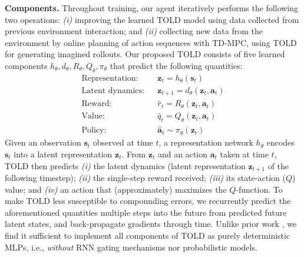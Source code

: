 \documentclass{article}
\begin{document}
\textbf{Components.} Throughout training, our agent iteratively performs the following two operations: \textit{(i)} improving the learned TOLD model using data collected from previous environment interaction; and \textit{(ii)} collecting new data from the environment by online planning of action sequences with TD-MPC, using TOLD for generating imagined rollouts. Our proposed TOLD consists of five learned components $h_{\theta},d_{\theta},R_{\theta},Q_{\theta},\pi_{\theta}$ that predict the following quantities:
\begin{equation}
\begin{array}{lll}
    \text{Representation:} && \mathbf{z}_{t} = h_{\theta}(\mathbf{s}_{t})\\
    \text{Latent dynamics:} && \mathbf{z}_{t+1} = d_{\theta}(\mathbf{z}_{t}, \mathbf{a}_{t})\\
    \text{Reward:} && \hat{r}_{t} = R_{\theta}(\mathbf{z}_{t}, \mathbf{a}_{t})\\
    \text{Value:} && \hat{q}_{t} = Q_{\theta}(\mathbf{z}_{t}, \mathbf{a}_{t})\\
    \text{Policy:} && \hat{\mathbf{a}}_{t} \sim \pi_{\theta}(\mathbf{z}_{t})
\end{array}
\end{equation}
Given an observation $\mathbf{s}_{t}$ observed at time $t$, a representation network $h_{\theta}$ encodes $\mathbf{s}_{t}$ into a latent representation $\mathbf{z}_{t}$. From $\mathbf{z}_{t}$ and an action $\mathbf{a}_{t}$ taken at time $t$, TOLD then predicts \textit{(i)} the latent dynamics (latent representation $\mathbf{z}_{t+1}$ of the following timestep); \textit{(ii)} the single-step reward received; \textit{(iii)} its state-action ($Q$) value; and \textit{(iv)} an action that (approximately) maximizes the $Q$-function. To make TOLD less susceptible to compounding errors, we recurrently predict the aforementioned quantities multiple steps into the future from predicted future latent states, and back-propagate gradients through time. Unlike prior work \citep{ha2018worldmodels, Janner2019WhenTT, hafner2019planet, Hafner2020DreamTC, Sikchi2020LearningOW}, we find it sufficient to implement all components of TOLD as purely deterministic MLPs, i.e., \textit{without} RNN gating mechanisms nor probabilistic models.
\end{document}
